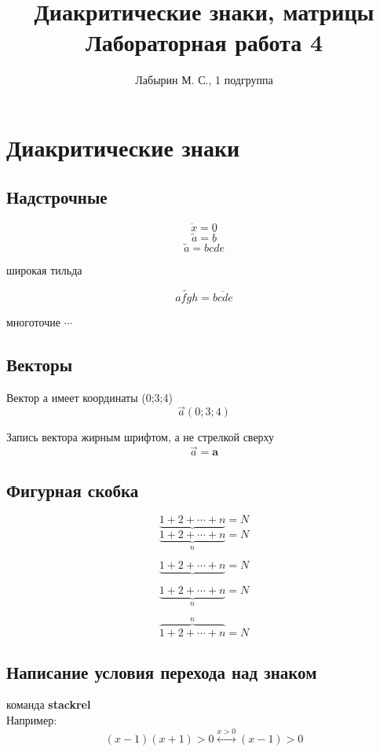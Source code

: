 \documentclass[12pt]{article}
\author{Лабырин М. С., 1 подгруппа}
\title{Диакритические знаки, матрицы\\Лабораторная работа 4}
\begin{document}
\maketitle

\section{Диакритические знаки}

\subsection{Надстрочные}

\[\dot{x} = 0\]
\[\tilde{a} = \bar{b}\]
\[\tilde{a} = \overline{bcde}\]

широкая тильда

\[\widetilde{afgh} = \overline{bcde}\]

многоточие $\cdots$

\subsection{Векторы}
Вектор а имеет координаты (0;3;4)
\[\overrightarrow{a}(0;3;4)\]

Запись вектора жирным шрифтом, а не стрелкой сверху
\[\overrightarrow{a} = \mathbf{a}\]

\subsection{Фигурная скобка}
\[\underbrace{1 + 2 + \cdots + n} = N\]
\[\underbrace{1 + 2 + \cdots + n}_n = N\]

\begin{equation}
  \underbrace{1 + 2 + \cdots + n} = N
\end{equation}

\begin{equation}
  \underbrace{1 + 2 + \cdots + n}_n = N
\end{equation}

\begin{equation}
  \overbrace{1 + 2 + \cdots + n}^n = N
\end{equation}

\subsection{Написание условия перехода над знаком}
команда \textbf{stackrel}\\
Например:
\[ (x - 1) (x + 1) > 0 \stackrel{x > 0}{\longleftrightarrow} (x - 1) > 0 \]
\end{document}
